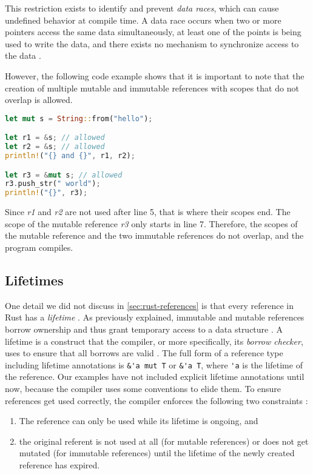 \documentclass[sigplan,11pt,nonacm]{acmart}
\begin{document}
This restriction exists to identify and prevent \emph{data races}, which can cause undefined behavior at compile time.
A data race occurs when two or more pointers access the same data simultaneously, at least one of the points is being used to write the data, and there exists no mechanism to synchronize access to the data \cite{rust-book}.

However, the following code example \cite{rust-book} shows that it is important to note that the creation of multiple mutable and immutable references with scopes that do not overlap is allowed.

\begin{lstlisting}[language=Rust]
let mut s = String::from("hello");

let r1 = &s; // allowed
let r2 = &s; // allowed
println!("{} and {}", r1, r2);

let r3 = &mut s; // allowed
r3.push_str(" world");
println!("{}", r3);
\end{lstlisting}

Since \emph{r1} and \emph{r2} are not used after line 5, that is where their scopes end.
The scope of the mutable reference \emph{r3} only starts in line 7.
Therefore, the scopes of the mutable reference and the two immutable references do not overlap, and the program compiles.


\subsection{Lifetimes}


One detail we did not discuss in \ref{sec:rust-references} is that every reference in Rust has a \emph{lifetime} \cite{rust-book}.
As previously explained, immutable and mutable references borrow ownership and thus grant temporary access to a data structure \cite{understanding-evolving-rust}.
A lifetime is a construct that the compiler, or more specifically, its \emph{borrow checker}, uses to ensure that all borrows are valid \cite{rust-by-example}.
The full form of a reference type including lifetime annotations is \verb|&'a mut T| or \verb|&'a T|, where \verb|'a| is the lifetime of the reference.
Our examples have not included explicit lifetime annotations until now, because the compiler uses some conventions to elide them.
To ensure references get used correctly, the compiler enforces the following two constraints \cite{understanding-evolving-rust}:
\begin{enumerate}
  \item The reference can only be used while its lifetime is ongoing, and
  \item the original referent is not used at all (for mutable references) or does not get mutated (for immutable references) until the lifetime of the newly created reference has expired.
\end{enumerate}
\end{document}
